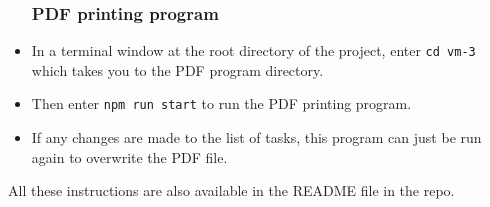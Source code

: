 \documentclass[12pt]{extarticle}
\begin{document}
\begin{itemize}
\subsubsection*{PDF printing program}
\item In a terminal window at the root directory of the project, enter \lstinline|cd vm-3| which takes you to the PDF program directory. 
\item Then enter \lstinline|npm run start| to run the PDF printing program.
\item If any changes are made to the list of tasks, this program can just be run again to overwrite the PDF file.

\end{itemize}

All these instructions are also available in the README file in the repo.
\end{document}
